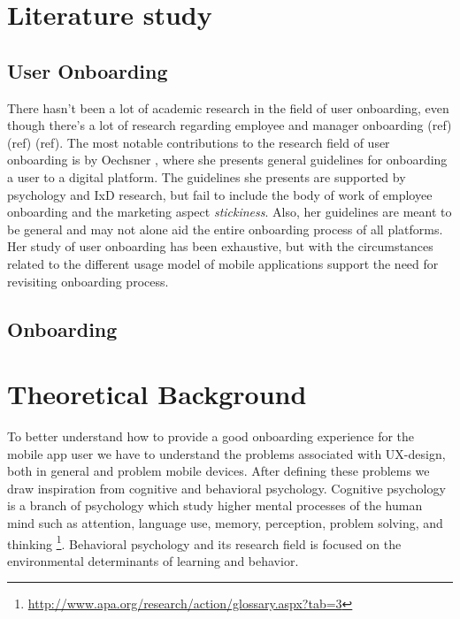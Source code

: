 \section{Literature study}
\subsection{User Onboarding}
There hasn't been a lot of academic research in the field of user onboarding, even though there's a lot of research regarding employee and manager onboarding (ref) (ref) (ref). The most notable contributions to the research field of user onboarding is by Oechsner \cite{Oechsner2016}, where she presents general guidelines for onboarding a user to a digital platform. The guidelines she presents are supported by psychology and IxD research, but fail to include the body of work of employee onboarding and the marketing aspect \textit{stickiness}. Also, her guidelines are meant to be general and may not alone aid the entire onboarding process of all platforms. Her study of user onboarding has been exhaustive, but with the circumstances related to the different usage model of mobile applications support the need for revisiting onboarding process.

\subsection{Onboarding}

\section{Theoretical Background}
To better understand how to provide a good onboarding experience for the mobile app user we have to understand the problems associated with UX-design, both in general and problem mobile devices. After defining these problems we draw inspiration from cognitive and behavioral psychology. Cognitive psychology is a branch of psychology which study higher mental processes of the human mind such as attention, language use, memory, perception, problem solving, and thinking \footnote{\url{http://www.apa.org/research/action/glossary.aspx?tab=3}}. Behavioral psychology and its research field is focused on the environmental determinants of learning and behavior.

